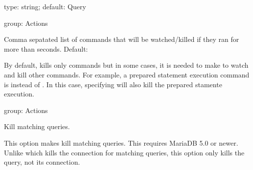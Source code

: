 \documentclass[letterpaper,10pt,english]{sphinxmanual}
\begin{document}
\begin{fulllineitems}
\label{\detokenize{mariadb-kill:cmdoption-mariadb-kill-kill-busy-commands}}
type: string; default: Query

group: Actions

Comma sepatated list of commands that will be watched/killed if they ran for
more than {\hyperref[\detokenize{mariadb-kill:cmdoption-mariadb-kill-busy-time}]{}} seconds. Default: 

By default, {\hyperref[\detokenize{mariadb-kill:cmdoption-mariadb-kill-busy-time}]{}} kills only  commands but in some cases, it
is needed to make {\hyperref[\detokenize{mariadb-kill:cmdoption-mariadb-kill-busy-time}]{}} to watch and kill other commands. For example,
a prepared statement execution command is  instead of . In this
case, specifying  will also kill the prepared
stamente execution.

\end{fulllineitems}


\begin{fulllineitems}
\label{\detokenize{mariadb-kill:cmdoption-mariadb-kill-kill-query}}
group: Actions

Kill matching queries.

This option makes  kill matching queries.  This requires MariaDB 5.0 or
newer.  Unlike {\hyperref[\detokenize{mariadb-kill:cmdoption-mariadb-kill-kill}]{}} which kills the connection for matching queries,
this option only kills the query, not its connection.

\end{fulllineitems}
\end{document}
